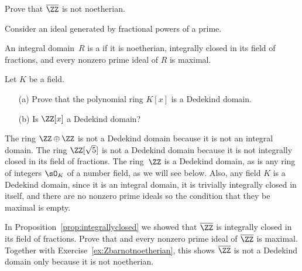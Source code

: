 \begin{exercise}\label{ex:Zbarnotnoetherian}
  Prove that $\overline{\ZZ}$ is not noetherian.

  \begin{hint}
    Consider an ideal generated by fractional powers of a prime.
  \end{hint}
\end{exercise}

\begin{definition}
  An integral domain~$R$ is a  if it is noetherian,
  integrally closed in its field of fractions, and every nonzero prime
  ideal of $R$ is maximal.
\end{definition}

\begin{exercise}
  Let $K$ be a field.
  \begin{enumerate}
    \item[(a)] Prove that the polynomial ring $K[x]$ is a Dedekind domain.
    \item[(b)] Is $\ZZ[x]$ a Dedekind domain?
  \end{enumerate}
\end{exercise}

The ring $\ZZ\oplus \ZZ$ is not a Dedekind domain because it is not an
integral domain.  The ring $\ZZ[\sqrt{5}]$ is not a Dedekind domain
because it is not integrally closed in its field of fractions.  The
ring~$\ZZ$ is a Dedekind domain, as is any ring of integers $\sO_K$ of a
number field, as we will see below.  Also, any field $K$ is a Dedekind
domain, since it is an integral domain, it is trivially integrally
closed in itself, and there are no nonzero prime ideals so the
condition that they be maximal is empty.

\begin{exercise}
  In Proposition~\ref{prop:integrallyclosed} we showed
  that $\overline{\ZZ}$ is integrally closed in its field of fractions.
  Prove that and every nonzero prime ideal of $\overline{\ZZ}$
  is maximal. Together with Exercise~\ref{ex:Zbarnotnoetherian},
  this shows $\overline{\ZZ}$ is not a Dedekind domain only because it
  is not noetherian.
\end{exercise}


